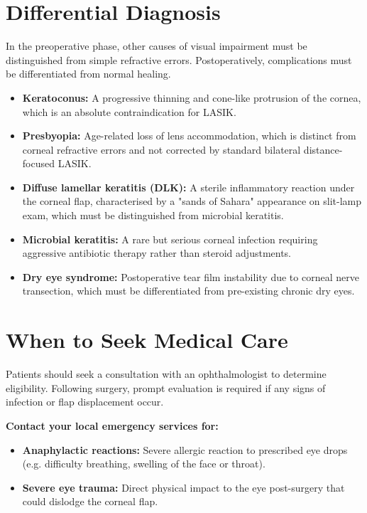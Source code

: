 \section*{Differential Diagnosis}
In the preoperative phase, other causes of visual impairment must be distinguished from simple refractive errors. Postoperatively, complications must be differentiated from normal healing.
\begin{itemize}
    \item \textbf{Keratoconus:} A progressive thinning and cone-like protrusion of the cornea, which is an absolute contraindication for LASIK.
    \item \textbf{Presbyopia:} Age-related loss of lens accommodation, which is distinct from corneal refractive errors and not corrected by standard bilateral distance-focused LASIK.
    \item \textbf{Diffuse lamellar keratitis (DLK):} A sterile inflammatory reaction under the corneal flap, characterised by a "sands of Sahara" appearance on slit-lamp exam, which must be distinguished from microbial keratitis.
    \item \textbf{Microbial keratitis:} A rare but serious corneal infection requiring aggressive antibiotic therapy rather than steroid adjustments.
    \item \textbf{Dry eye syndrome:} Postoperative tear film instability due to corneal nerve transection, which must be differentiated from pre-existing chronic dry eyes.
\end{itemize}

\section*{When to Seek Medical Care}
Patients should seek a consultation with an ophthalmologist to determine eligibility. Following surgery, prompt evaluation is required if any signs of infection or flap displacement occur.

\textbf{Contact your local emergency services for:}
\begin{itemize}
    \item \textbf{Anaphylactic reactions:} Severe allergic reaction to prescribed eye drops (e.g. difficulty breathing, swelling of the face or throat).
    \item \textbf{Severe eye trauma:} Direct physical impact to the eye post-surgery that could dislodge the corneal flap.
\end{itemize}

